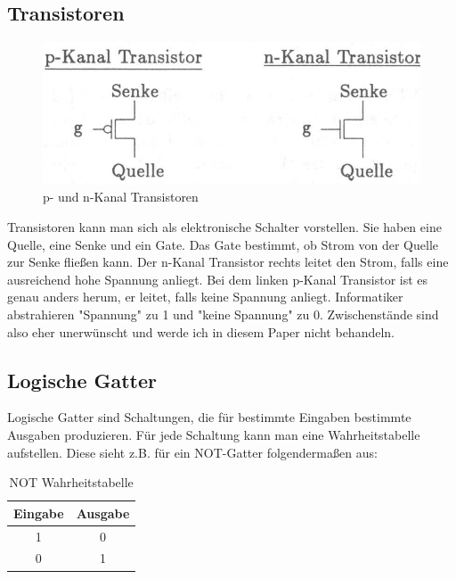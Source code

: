 \documentclass[12pt, a4paper]{article}
\begin{document}
\subsection{Transistoren}
\begin{figure}[H]
	\begin{center}
		\includegraphics [width=14cm]{Transistoren.png}
	\end{center}
	\caption{p- und n-Kanal Transistoren}
\end{figure}
Transistoren kann man sich als elektronische Schalter vorstellen. Sie haben eine Quelle, eine Senke und ein Gate. Das Gate bestimmt, ob Strom von der Quelle zur Senke fließen kann. Der n-Kanal Transistor rechts leitet den Strom, falls eine ausreichend hohe Spannung anliegt. Bei dem linken p-Kanal Transistor ist es genau anders herum, er leitet, falls keine Spannung anliegt. Informatiker abstrahieren "Spannung" zu 1 und "keine Spannung" zu 0. Zwischenstände sind also eher unerwünscht und werde ich in diesem Paper nicht behandeln.


\subsection{Logische Gatter}
Logische Gatter sind Schaltungen, die für bestimmte Eingaben bestimmte Ausgaben produzieren. Für jede Schaltung kann man eine Wahrheitstabelle aufstellen. Diese sieht z.B. für ein NOT-Gatter folgendermaßen aus:

\begin{table}[H]
	\begin{center}
		\begin{tabular}{|c|c|} \hline
			Eingabe & Ausgabe \\ \hline
			1 & 0 \\
			0 & 1 \\ \hline
		\end{tabular}\\
	\end{center}
	\caption{NOT Wahrheitstabelle}
\end{table}
\end{document}
